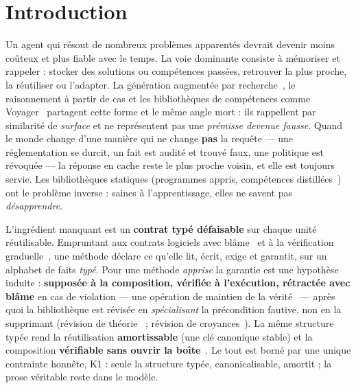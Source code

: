 \documentclass[11pt]{article}
\newcommand{\K}{\textsf{K1}}
\begin{document}
\section{Introduction}
Un agent qui résout de nombreux problèmes apparentés devrait devenir moins coûteux et plus fiable avec le temps.
La voie dominante consiste à mémoriser et rappeler : stocker des solutions ou compétences passées, retrouver la
plus proche, la réutiliser ou l'adapter. La génération augmentée par recherche~\cite{lewis2020}, le raisonnement à
partir de cas et les bibliothèques de compétences comme Voyager~\cite{wang2023} partagent cette forme et le même
angle mort : ils rappellent par similarité de \emph{surface} et ne représentent pas une \emph{prémisse devenue
fausse}. Quand le monde change d'une manière qui ne change \textbf{pas} la requête --- une réglementation se
durcit, un fait est audité et trouvé faux, une politique est révoquée --- la réponse en cache reste le plus proche
voisin, et elle est toujours servie. Les bibliothèques statiques (programmes appris, compétences
distillées~\cite{ellis2021,bowers2023}) ont le problème inverse : saines à l'apprentissage, elles ne savent pas
\emph{désapprendre}.

L'ingrédient manquant est un \textbf{contrat typé défaisable} sur chaque unité réutilisable. Empruntant aux
contrats logiciels avec blâme~\cite{findler2002} et à la vérification graduelle~\cite{bader2018}, une méthode
déclare ce qu'elle lit, écrit, exige et garantit, sur un alphabet de faits \emph{typé}. Pour une méthode
\emph{apprise} la garantie est une hypothèse induite : \textbf{supposée à la composition, vérifiée à l'exécution,
rétractée avec blâme} en cas de violation --- une opération de maintien de la vérité~\cite{doyle1979,dekleer1986}
--- après quoi la bibliothèque est révisée en \emph{spécialisant} la précondition fautive, non en la supprimant
(révision de théorie~\cite{ourston1994,richards1995} ; révision de croyances~\cite{agm1985}). La même structure
typée rend la réutilisation \textbf{amortissable} (une clé canonique stable) et la composition \textbf{vérifiable
sans ouvrir la boîte}~\cite{ohearn2001,reynolds2002}. Le tout est borné par une unique contrainte honnête, \K{} :
seule la structure typée, canonicalisable, amortit ; la prose véritable reste dans le modèle.
\end{document}
